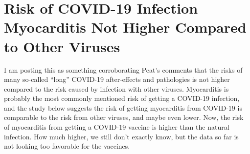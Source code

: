 \chapter{Risk of COVID-19 Infection Myocarditis Not Higher Compared to Other Viruses}

\begin{refsection}

I am posting this as something corroborating Peat's comments that the risks of many so-called \enquote{long} COVID-19 after-effects and pathologies is not higher compared to the risk caused by infection with other viruses. Myocarditis is probably the most commonly mentioned risk of getting a COVID-19 infection, and the study below suggests the risk of getting myocarditis from COVID-19 is comparable to the risk from other viruses, and maybe even lower. Now, the risk of myocarditis from getting a COVID-19 vaccine is higher than the natural infection. How much higher, we still don't exactly know, but the data so far is not looking too favorable for the vaccines.\textsuperscript{\cite{url27d1249b}}

\printbibliography[heading=subbibliography]

\end{refsection}